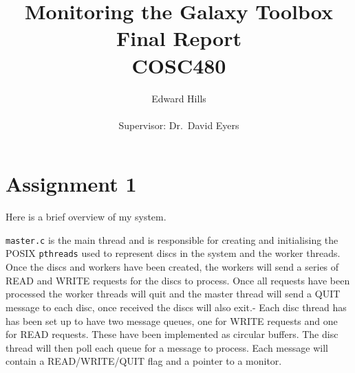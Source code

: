 \documentclass[12pt]{article}
\title{Monitoring the Galaxy Toolbox \\ Final Report \\ COSC480}
\author{Edward Hills \\ \\ Supervisor: Dr.\ David Eyers}
\begin{document}
\vspace{-1cm}

\maketitle

\section{Assignment 1}

Here is a brief overview of my system.

\texttt{master.c} is the main thread and is responsible for creating and initialising the POSIX \texttt{pthreads} used to represent discs in the system and the worker threads. Once the discs and workers have been created, the workers will send a series of READ and WRITE requests for the discs to process. Once all requests have been processed the worker threads will quit and the master thread will send a QUIT message to each disc, once received the discs will also exit.-
Each disc thread has has been set up to have two message queues, one for WRITE requests and one for READ requests. These have been implemented as circular buffers. The disc thread will then poll each queue for a message to process. Each message will contain a READ/WRITE/QUIT flag and a pointer to a monitor.
\end{document}
